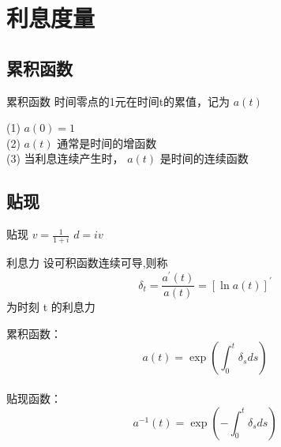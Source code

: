 	\chapter{利息度量}
		\section{累积函数}
	\begin{definition}{累积函数}
\noindent 	时间零点的1元在时间t的累值，记为 $a(t)$
		\end{definition}
\begin{property}
  \noindent  (1) $a(0)=1$\\
(2) $a(t)$ 通常是时间的增函数\\
(3) 当利息连续产生时， $a(t)$ 是时间的连续函数
\end{property}
	\section{贴现}
	\begin{definition}{贴现}
\noindent	$v=\frac{1}{1+i}$  $d=iv$
	\end{definition}
	
\begin{definition}{利息力}
\noindent		设可积函数连续可导,则称
\[
\delta_{t}=\frac{a^{\prime}(t)}{a(t)}=[\ln a(t)]^{\prime}
\]
为时刻 t 的利息力
		\end{definition}
\begin{property}
	累积函数：\\
\[
a(t)=\exp \left(\int_{0}^{t} \delta_{s} d s\right)
\]\\
 贴现函数：\\
\[
a^{-1}(t)=\exp \left(-\int_{0}^{t} \delta_{s} d s\right)
\]
	\end{property}